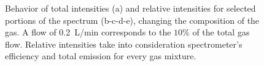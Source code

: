 \begin{figure}
\centering
  
  
  \hfill
  
\caption{Behavior of total intensities (a) and relative intensities for selected portions of the spectrum (b-c-d-e), changing the composition of the gas. A flow of \SI{0.2}{\liter/\minute} corresponds to the $\num{10}\%$ of the total gas flow. Relative intensities take into consideration spectrometer's efficiency and total emission for every gas mixture.}
 \label{fig:Irel_flow}
\end{figure}


